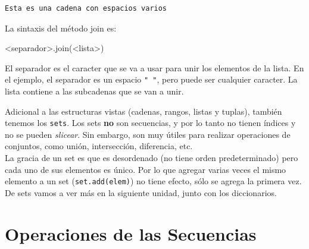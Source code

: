 \documentclass[
  letterpaper,
  DIV=11,
  numbers=noendperiod]{scrreprt}
\newenvironment{Shaded}{\begin{snugshade}}{\end{snugshade}}
\newcommand{\NormalTok}[1]{\textcolor[rgb]{0.00,0.23,0.31}{#1}}
\newcommand{\OperatorTok}[1]{\textcolor[rgb]{0.37,0.37,0.37}{#1}}
\begin{document}
\begin{verbatim}
Esta es una cadena con espacios varios
\end{verbatim}

La sintaxis del método join es:

\begin{Shaded}
\begin{Highlighting}[]
\OperatorTok{\textless{}}\NormalTok{separador}\OperatorTok{\textgreater{}}\NormalTok{.join(}\OperatorTok{\textless{}}\NormalTok{lista}\OperatorTok{\textgreater{}}\NormalTok{)}
\end{Highlighting}
\end{Shaded}

El separador es el caracter que se va a usar para unir los elementos de
la lista. En el ejemplo, el separador es un espacio \texttt{"\ "}, pero
puede ser cualquier caracter. La lista contiene a las subcadenas que se
van a unir.

\begin{tcolorbox}[enhanced jigsaw, bottomrule=.15mm, leftrule=.75mm, opacityback=0, colback=white, toprule=.15mm, bottomtitle=1mm, opacitybacktitle=0.6, rightrule=.15mm, left=2mm, arc=.35mm, coltitle=black, title=\textcolor{quarto-callout-note-color}{\faInfo}\hspace{0.5em}{Set}, breakable, toptitle=1mm, colframe=quarto-callout-note-color-frame, titlerule=0mm, colbacktitle=quarto-callout-note-color!10!white]

Adicional a las estructuras vistas (cadenas, rangos, listas y tuplas),
también tenemos los \texttt{sets}. Los sets \textbf{no} son secuencias,
y por lo tanto no tienen índices y no se pueden \emph{slicear}. Sin
embargo, son muy útiles para realizar operaciones de conjuntos, como
unión, intersección, diferencia, etc.\\

La gracia de un set es que es desordenado (no tiene orden
predeterminado) pero cada uno de sus elementos es único. Por lo que
agregar varias veces el mismo elemento a un set (\texttt{set.add(elem)})
no tiene efecto, sólo se agrega la primera vez.\\

De sets vamos a ver más en la siguiente unidad, junto con los
diccionarios.

\end{tcolorbox}

\section{Operaciones de las
Secuencias}\label{operaciones-de-las-secuencias}
\end{document}
